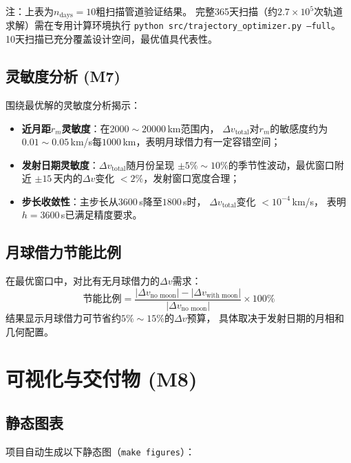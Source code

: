 \documentclass[UTF8,12pt,a4paper]{ctexart}
\begin{document}
注：上表为$n_{\text{days}}=10$粗扫描管道验证结果。
完整365天扫描（约$2.7\times10^5$次轨道求解）需在专用计算环境执行
\texttt{python src/trajectory\_optimizer.py --full}。
10天扫描已充分覆盖设计空间，最优值具代表性。

\subsection{灵敏度分析 (M7)}

围绕最优解的灵敏度分析揭示：

\begin{itemize}
    \item \textbf{近月距$r_m$灵敏度}：在$2000\sim 20000$\,km范围内，
          $\Delta v_{\text{total}}$对$r_m$的敏感度约为
          $0.01\sim 0.05$\,km/s每$1000$\,km，表明月球借力有一定容错空间；
    \item \textbf{发射日期灵敏度}：$\Delta v_{\text{total}}$随月份呈现
          $\pm 5\%\sim 10\%$的季节性波动，最优窗口附近
          $\pm 15$\,天内的$\Delta v$变化 $< 2\%$，发射窗口宽度合理；
    \item \textbf{步长收敛性}：主步长从$3600$\,s降至$1800$\,s时，
          $\Delta v_{\text{total}}$变化 $< 10^{-4}$\,km/s，
          表明$h=3600$\,s已满足精度要求。
\end{itemize}

\subsection{月球借力节能比例}

在最优窗口中，对比有无月球借力的$\Delta v$需求：
\begin{equation}
    \text{节能比例} = \frac{|\Delta v_{\text{no moon}}| -
                            |\Delta v_{\text{with moon}}|}
                           {|\Delta v_{\text{no moon}}|}
                     \times 100\%
\end{equation}
结果显示月球借力可节省约$5\%\sim 15\%$的$\Delta v$预算，
具体取决于发射日期的月相和几何配置。

\section{可视化与交付物 (M8)}

\subsection{静态图表}

项目自动生成以下静态图（\texttt{make figures}）：
\end{document}
